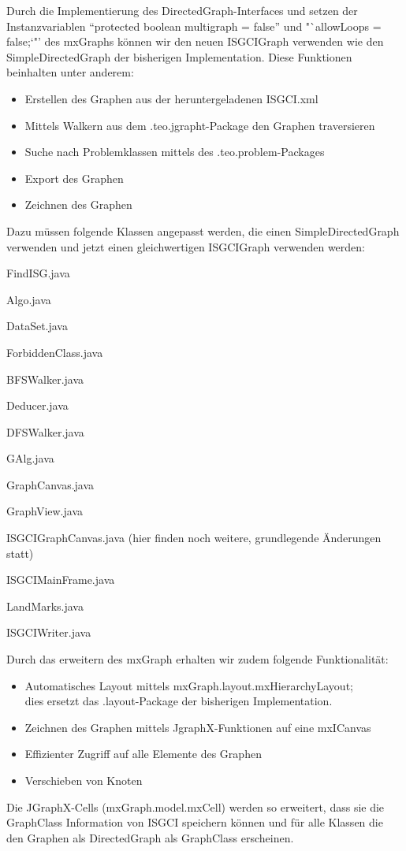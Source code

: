 \documentclass[10pt,a4paper]{article}
\begin{document}
Durch die Implementierung des DirectedGraph-Interfaces und setzen der Instanzvariablen "`protected boolean multigraph = false"' und "`allowLoops = false;`"' des mxGraphs können wir den neuen ISGCIGraph verwenden wie den SimpleDirectedGraph der bisherigen Implementation. Diese Funktionen beinhalten unter anderem: \begin{itemize}
\item Erstellen des Graphen aus der heruntergeladenen ISGCI.xml
\item Mittels Walkern aus dem .teo.jgrapht-Package den Graphen traversieren
\item Suche nach Problemklassen mittels des .teo.problem-Packages
\item Export des Graphen
\item Zeichnen des Graphen

\end{itemize}
Dazu müssen folgende Klassen angepasst werden, die einen SimpleDirectedGraph verwenden und jetzt einen gleichwertigen ISGCIGraph verwenden werden: \begin{description}
\item FindISG.java
\item Algo.java
\item DataSet.java
\item ForbiddenClass.java
\item BFSWalker.java
\item Deducer.java
\item DFSWalker.java
\item GAlg.java
\item GraphCanvas.java
\item GraphView.java
\item ISGCIGraphCanvas.java (hier finden noch weitere, grundlegende Änderungen statt)
\item ISGCIMainFrame.java
\item LandMarks.java
\item ISGCIWriter.java
\end{description}
 Durch das erweitern des mxGraph erhalten wir zudem folgende Funktionalität: \begin{itemize}
 \item Automatisches Layout mittels mxGraph.layout.mxHierarchyLayout; \\dies ersetzt das .layout-Package der bisherigen Implementation.
 \item Zeichnen des Graphen mittels JgraphX-Funktionen auf eine mxICanvas
 \item Effizienter Zugriff auf alle Elemente des Graphen
 \item Verschieben von Knoten
 \end{itemize}
Die JGraphX-Cells (mxGraph.model.mxCell) werden so erweitert, dass sie die GraphClass Information von ISGCI speichern können und für alle Klassen die den Graphen als DirectedGraph als GraphClass erscheinen.
\end{document}
